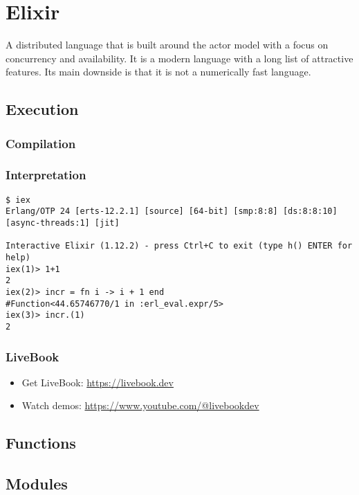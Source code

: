 {
\setmonofont[
  Contextuals={Alternate}
]{Fira Code}

\section{Elixir}

A distributed language that is built around the actor model with a focus on concurrency and availability. It is a modern language with a long list of attractive features. Its main downside is that it is not a numerically fast language.

\subsection{Execution}
\subsubsection{Compilation}
\subsubsection{Interpretation}

\begin{verbatim}
$ iex
Erlang/OTP 24 [erts-12.2.1] [source] [64-bit] [smp:8:8] [ds:8:8:10] [async-threads:1] [jit]

Interactive Elixir (1.12.2) - press Ctrl+C to exit (type h() ENTER for help)
iex(1)> 1+1
2
iex(2)> incr = fn i -> i + 1 end
#Function<44.65746770/1 in :erl_eval.expr/5>
iex(3)> incr.(1)
2
\end{verbatim}

\subsubsection{LiveBook}

\begin{itemize}
  \item Get LiveBook: \url{https://livebook.dev}
  \item Watch demos: \url{https://www.youtube.com/@livebookdev}
\end{itemize}

\subsection{Functions}

\subsection{Modules}

}
